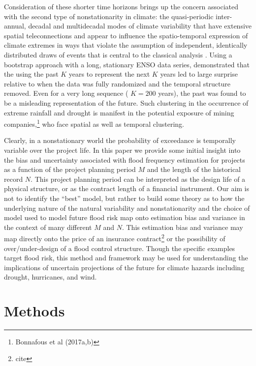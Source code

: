 \documentclass[12pt]{article}
\begin{document}
Consideration of these shorter time horizons brings up the concern associated with the second type of nonstationarity in climate: the quasi-periodic inter-annual, decadal and multidecadal modes of climate variability that have extensive spatial teleconnections and appear to influence the spatio-temporal expression of climate extremes in ways that violate the assumption of independent, identically distributed draws of events that is central to the classical analysis \citep[see][]{Merz2014,Serinaldi2015,Hoskins2015,Hannachi2017}.
Using a bootstrap approach with a long, stationary ENSO data series, \citet{Jain2001} demonstrated that the using the past \(K\) years to represent the next \(K\) years led to large surprise relative to when the data was fully randomized and the temporal structure removed.
Even for a very long sequence (\ie{} \(K=200\) years), the past was found to be a misleading representation of the future.
Such clustering in the occurrence of extreme rainfall and drought is manifest in the potential exposure of mining companies,\footnote{Bonnafous et al (2017a,b)} who face spatial as well as temporal clustering.

Clearly, in a nonstationary world the probability of exceedance is temporally variable over the project life.
In this paper we provide some initial insight into the bias and uncertainty associated with flood frequency estimation for projects as a function of the project planning period \(M\) and the length of the historical record \(N\).
This project planning period can be interpreted as the design life of a physical structure, or as the contract length of a financial instrument.
Our aim is not to identify the ``best'' model, but rather to build some theory as to how the underlying nature of the natural variability and nonstationarity and the choice of model used to model future flood risk map onto estimation bias and variance in the context of many different \(M\) and \(N\).
This estimation bias and variance may map directly onto the price of an insurance contract\footnote{cite} or the possibility of over/under-design of a flood control structure.
Though the specific examples target flood risk, this method and framework may be used for understanding the implications of uncertain projections of the future for climate hazards including drought, hurricanes, and wind.

\section{Methods}\label{sec:methods}
\end{document}
